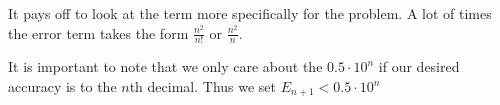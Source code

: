 It pays off to look at the term more specifically for the problem. A lot of times the
error term takes the form $\frac{n^2}{n!}$ or $\frac{n^2}{n}$.

It is important to note that we only care about the $0.5 \cdot 10^n$ if our desired
accuracy is to the $n$th decimal. Thus we set $E_{n+1} < 0.5 \cdot 10^n$
